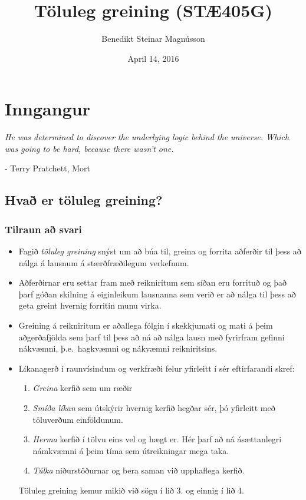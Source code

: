 \documentclass[letterpaper,10pt,icelandic]{sphinxmanual}
\title{Töluleg greining (STÆ405G)}
\date{April 14, 2016}
\author{Benedikt Steinar Magnússon}
\begin{document}
\maketitle
\tableofcontents
{}\label{index::doc}



\chapter{Inngangur}
\label{kafli01::doc}\label{kafli01:inngangur}
\emph{He was determined to discover the underlying logic behind the universe. Which was going to be hard, because there wasn't one.}

- Terry Pratchett, Mort


\section{Hvað er töluleg greining?}
\label{kafli01:hva-er-toluleg-greining}

\subsection{Tilraun að svari}
\label{kafli01:tilraun-a-svari}\begin{itemize}
\item {} 
Fagið \emph{töluleg greining} snýst um að búa til, greina og forrita
aðferðir til þess að nálga á lausnum á stærðfræðilegum verkefnum.

\item {} 
Aðferðirnar eru settar fram með reikniritum sem síðan eru forrituð og
það þarf góðan skilning á eiginleikum lausnanna sem verið er að nálga
til þess að geta greint hvernig forritin munu virka.

\item {} 
Greining á reikniritum er aðallega fólgin í skekkjumati og mati á
þeim aðgerðafjölda sem þarf til þess að ná að nálga lausn með
fyrirfram gefinni nákvæmni, þ.e. hagkvæmni og nákvæmni reikniritsins.

\item {} 
Líkanagerð í raunvísindum og verkfræði felur yfirleitt í sér eftirfarandi skref:
\begin{enumerate}
\item {} 
\emph{Greina} kerfið sem um ræðir

\item {} 
\emph{Smíða líkan} sem útskýrir hvernig kerfið hegðar sér, þó yfirleitt með töluverðum einföldunum.

\item {} 
\emph{Herma} kerfið í tölvu eins vel og hægt er. Hér þarf að ná ásættanlegri námkvæmni á þeim tíma sem útreikningar mega taka.

\item {} 
\emph{Túlka} niðurstöðurnar og bera saman við upphaflega kerfið.

\end{enumerate}

Töluleg greining kemur mikið við sögu í lið 3. og einnig í lið 4.

\end{itemize}
\end{document}
